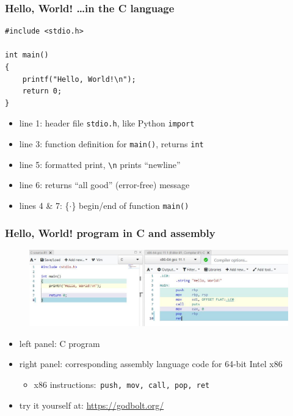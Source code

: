 \documentclass[english,14pt]{beamer}
\begin{document}
\begin{frame}[fragile]

\frametitle{Hello, World!  \ldots in the C language}

\begin{lstlisting}[style=CStyle,basicstyle=\small]
#include <stdio.h>

int main()
{
    printf("Hello, World!\n");
    return 0;
}
\end{lstlisting}

\begin{itemize}
	\item line 1: header file \texttt{stdio.h}, like Python \texttt{import}
	\item line 3: function definition for \texttt{main()}, returns \texttt{int}
	\item line 5: formatted print, \verb+\n+ prints ``newline''
	\item line 6: returns ``all good'' (error-free) message
	\item lines 4 \& 7: \{$\cdot$\} begin/end of function \texttt{main()}
\end{itemize}

\end{frame}


\begin{frame}[fragile]

\frametitle{Hello, World! program in C and assembly}

\begin{figure}[ht]
	\centering
	\includegraphics[width=\textwidth]{figures/Cvsx86assembly}
\end{figure}

\begin{itemize}
	\item left panel: C program
	\item right panel: corresponding assembly language code for 64-bit Intel x86
	\begin{itemize}
		\item x86 instructions:~\texttt{push, mov, call, pop, ret}
	\end{itemize}
	\item try it yourself at: \href{https://godbolt.org/}{https://godbolt.org/}
\end{itemize}

\end{frame}
\end{document}

